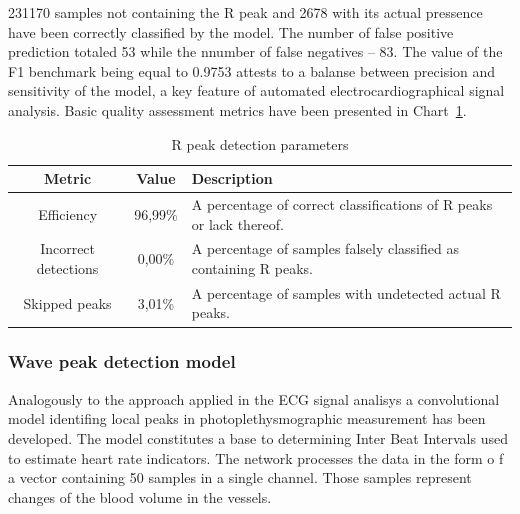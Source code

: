\documentclass[journal]{IEEEtran}
\begin{document}
{231170 samples not containing the R peak and 2678 with its actual pressence have been correctly classified by the model. The number of false positive prediction totaled 53 while the  nnumber of false negatives -- 83. The value of the F1 benchmark being equal to 0.9753 attests to a balanse between precision and sensitivity of the model, a key feature of automated electrocardiographical signal analysis. Basic quality assessment metrics have been presented in Chart~\ref{tab:metrics}.

\begin{table}[ht]
\centering
\caption{R peak detection parameters}
\label{tab:metrics}
\begin{tabular}{|c|c|p{4.6cm}|}
\hline
\textbf{Metric} & \textbf{Value} & \textbf{Description} \\
\hline
Efficiency & 96,99\% & A percentage of correct classifications of R peaks or lack thereof. \\
Incorrect detections & 0,00\% & A percentage of samples falsely classified as containing R peaks. \\
Skipped peaks & 3,01\% & A percentage of samples with undetected actual R peaks. \\
\hline
\end{tabular}
\end{table}

\subsubsection{Wave peak detection model}
Analogously to the approach applied in the ECG signal analisys a convolutional model identifing local peaks in photoplethysmographic measurement has been developed. The model constitutes a base to determining Inter Beat Intervals used to estimate heart rate indicators. The network processes the data in the form o f a vector containing 50 samples in a single channel. Those samples represent changes of the blood volume in the vessels.

}
\end{document}
